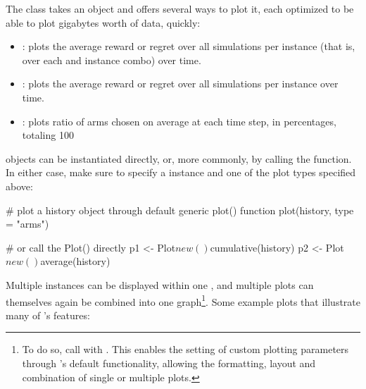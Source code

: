 \documentclass{jss}
\begin{document}
The  class takes an  object and offers several ways to plot it, each optimized to be able to plot gigabytes worth of data, quickly:

\begin{itemize}
         \item {}: plots the average reward or regret over all simulations per  instance (that is, over each  and  instance combo) over time.
         \item {}: plots the average reward or regret over all simulations per  instance over time.
         \item {}: plots ratio of arms chosen on average at each time step, in percentages, totaling 100%

\end{itemize}

 objects can be instantiated directly, or, more commonly, by calling the  function. In either case, make sure to specify a  instance and one of the plot types specified above:

\begin{Code}
# plot a history object through default generic plot() function
plot(history, type = "arms")

# or call the Plot() directly
p1 <- Plot$new()$cumulative(history)
p2 <- Plot$new()$average(history)
\end{Code}

Multiple  instances can be displayed within one , and multiple plots can themselves again be combined into one graph\footnote{To do so, call  with . This enables the setting of custom plotting parameters through 's default  functionality, allowing the formatting, layout and combination of single or multiple plots.}. Some example plots that illustrate many of 's features:
\end{document}
